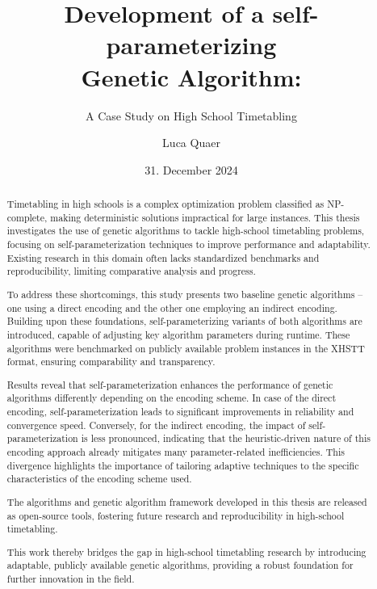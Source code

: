 \documentclass[english,examples]{isasthesis}
\title{Development of a self-parameterizing\\Genetic Algorithm:}
\subtitle{A Case Study on High School Timetabling}
\author{Luca Quaer}
\date{31. December 2024}
\begin{document}
\maketitle


\begin{abstract}
Timetabling in high schools is a complex optimization problem classified as
NP-complete, making deterministic solutions impractical for large instances.
This thesis investigates the use of genetic algorithms to tackle high-school
timetabling problems, focusing on self-parameterization techniques to improve
performance and adaptability. Existing research in this domain often lacks
standardized benchmarks and reproducibility, limiting comparative analysis and
progress.

To address these shortcomings, this study presents two baseline genetic
algorithms -- one using a direct encoding and the other one employing an
indirect encoding.
Building upon these foundations, self-parameterizing variants of both
algorithms are introduced, capable of adjusting key algorithm parameters during
runtime.
These algorithms were benchmarked on publicly available problem instances
in the XHSTT format, ensuring comparability and transparency.

Results reveal that self-parameterization enhances the performance of genetic
algorithms differently depending on the encoding scheme.
In case of the direct encoding, self-parameterization leads to significant
improvements in reliability and convergence speed.
Conversely, for the indirect encoding, the impact of self-parameterization is
less pronounced, indicating that the heuristic-driven nature of this encoding
approach already mitigates many parameter-related inefficiencies.
This divergence highlights the importance of tailoring adaptive techniques to
the specific characteristics of the encoding scheme used.

The algorithms and genetic algorithm framework developed in this thesis are
released as open-source tools, fostering future research and reproducibility
in high-school timetabling.

This work thereby bridges the gap in high-school timetabling research by
introducing adaptable, publicly available genetic algorithms, providing a
robust foundation for further innovation in the field.
\end{abstract}
\end{document}
